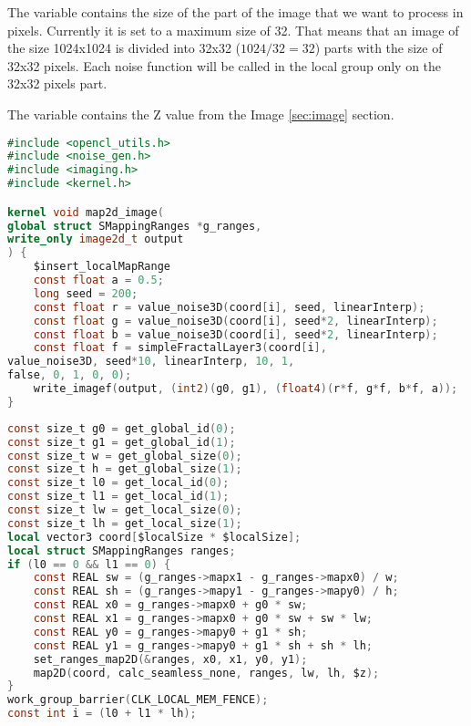 The variable  contains the size of the part of the
image that we want to process in pixels. Currently it is set to a maximum size of 32.
That means that an image of the size 1024x1024 is divided into 32x32 ($1024/32=32$) parts
with the size of 32x32 pixels. Each noise function will be called in the local group
only on the 32x32 pixels part.

The variable  contains the Z value from the Image \ref{sec:image} section.

\begin{lstlisting}[caption={Kernel Example},label={lst:kernel_example},language=OpenCL]
#include <opencl_utils.h>
#include <noise_gen.h>
#include <imaging.h>
#include <kernel.h>

kernel void map2d_image(
global struct SMappingRanges *g_ranges,
write_only image2d_t output
) {
    $insert_localMapRange
    const float a = 0.5;
    long seed = 200;
    const float r = value_noise3D(coord[i], seed, linearInterp);
    const float g = value_noise3D(coord[i], seed*2, linearInterp);
    const float b = value_noise3D(coord[i], seed*2, linearInterp);
    const float f = simpleFractalLayer3(coord[i], 
value_noise3D, seed*10, linearInterp, 10, 1, 
false, 0, 1, 0, 0);
    write_imagef(output, (int2)(g0, g1), (float4)(r*f, g*f, b*f, a));
}
\end{lstlisting}

\begin{lstlisting}[caption={Kernel Example},label={lst:insert_local_map_range},language=OpenCL]
const size_t g0 = get_global_id(0);
const size_t g1 = get_global_id(1);
const size_t w = get_global_size(0);
const size_t h = get_global_size(1);
const size_t l0 = get_local_id(0);
const size_t l1 = get_local_id(1);
const size_t lw = get_local_size(0);
const size_t lh = get_local_size(1);
local vector3 coord[$localSize * $localSize];
local struct SMappingRanges ranges;
if (l0 == 0 && l1 == 0) {
    const REAL sw = (g_ranges->mapx1 - g_ranges->mapx0) / w;
    const REAL sh = (g_ranges->mapy1 - g_ranges->mapy0) / h;
    const REAL x0 = g_ranges->mapx0 + g0 * sw;
    const REAL x1 = g_ranges->mapx0 + g0 * sw + sw * lw;
    const REAL y0 = g_ranges->mapy0 + g1 * sh;
    const REAL y1 = g_ranges->mapy0 + g1 * sh + sh * lh;
    set_ranges_map2D(&ranges, x0, x1, y0, y1);
    map2D(coord, calc_seamless_none, ranges, lw, lh, $z);
}
work_group_barrier(CLK_LOCAL_MEM_FENCE);
const int i = (l0 + l1 * lh);
\end{lstlisting}
